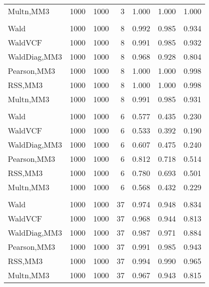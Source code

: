 \documentclass[
]{article}
\begin{document}
\begin{table}[H]
{\begin{tabular}[t]{lrrrrrr}
\hspace{1em}Multn,MM3 & 1000 & 1000 & 3 & 1.000 & 1.000 & 1.000\\
\addlinespace[0.3em]
\multicolumn{7}{l}{\textbf{1F 15V}}\\
\hspace{1em}Wald & 1000 & 1000 & 8 & 0.992 & 0.985 & 0.934\\
\hspace{1em}WaldVCF & 1000 & 1000 & 8 & 0.991 & 0.985 & 0.932\\
\hspace{1em}WaldDiag,MM3 & 1000 & 1000 & 8 & 0.968 & 0.928 & 0.804\\
\hspace{1em}Pearson,MM3 & 1000 & 1000 & 8 & 1.000 & 1.000 & 0.998\\
\hspace{1em}RSS,MM3 & 1000 & 1000 & 8 & 1.000 & 1.000 & 0.998\\
\hspace{1em}Multn,MM3 & 1000 & 1000 & 8 & 0.991 & 0.985 & 0.931\\
\addlinespace[0.3em]
\multicolumn{7}{l}{\textbf{2F 10V}}\\
\hspace{1em}Wald & 1000 & 1000 & 6 & 0.577 & 0.435 & 0.230\\
\hspace{1em}WaldVCF & 1000 & 1000 & 6 & 0.533 & 0.392 & 0.190\\
\hspace{1em}WaldDiag,MM3 & 1000 & 1000 & 6 & 0.607 & 0.475 & 0.240\\
\hspace{1em}Pearson,MM3 & 1000 & 1000 & 6 & 0.812 & 0.718 & 0.514\\
\hspace{1em}RSS,MM3 & 1000 & 1000 & 6 & 0.780 & 0.693 & 0.501\\
\hspace{1em}Multn,MM3 & 1000 & 1000 & 6 & 0.568 & 0.432 & 0.229\\
\addlinespace[0.3em]
\multicolumn{7}{l}{\textbf{3F 15V}}\\
\hspace{1em}Wald & 1000 & 1000 & 37 & 0.974 & 0.948 & 0.834\\
\hspace{1em}WaldVCF & 1000 & 1000 & 37 & 0.968 & 0.944 & 0.813\\
\hspace{1em}WaldDiag,MM3 & 1000 & 1000 & 37 & 0.987 & 0.971 & 0.884\\
\hspace{1em}Pearson,MM3 & 1000 & 1000 & 37 & 0.991 & 0.985 & 0.943\\
\hspace{1em}RSS,MM3 & 1000 & 1000 & 37 & 0.994 & 0.990 & 0.965\\
\hspace{1em}Multn,MM3 & 1000 & 1000 & 37 & 0.967 & 0.943 & 0.815\\
\bottomrule
\end{tabular}}
\endgroup{}
\end{table}
\end{document}
